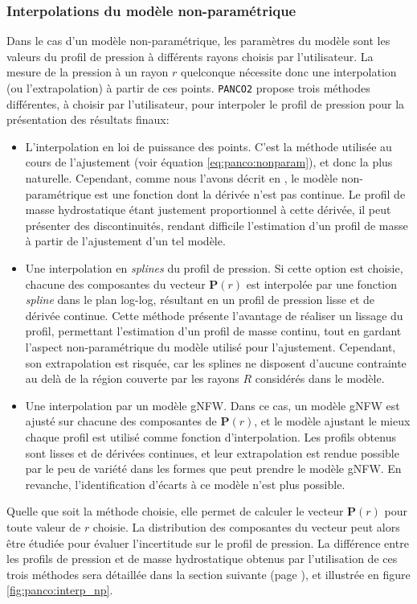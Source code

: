 \subsubsection{Interpolations du modèle non-paramétrique} %
\label{sec:panco:interp_np}
Dans le cas d'un modèle non-paramétrique, les paramètres du modèle sont les valeurs du profil de pression à différents rayons choisis par l'utilisateur.
La mesure de la pression à un rayon $r$ quelconque nécessite donc une interpolation (ou l'extrapolation) à partir de ces points.
\texttt{PANCO2} propose trois méthodes différentes, à choisir par l'utilisateur, pour interpoler le profil de pression pour la présentation des résultats finaux:
\begin{itemize}[leftmargin=*]
    \setlength\itemsep{0pt}
    \item L'interpolation en loi de puissance des points.
        C'est la méthode utilisée au cours de l'ajustement (voir équation \ref{eq:panco:nonparam}), et donc la plus naturelle.
        Cependant, comme nous l'avons décrit en , le modèle non-paramétrique est une fonction dont la dérivée n'est pas continue.
        Le profil de masse hydrostatique étant justement proportionnel à cette dérivée, il peut présenter des discontinuités, rendant difficile l'estimation d'un profil de masse à partir de l'ajustement d'un tel modèle.
    \item Une interpolation en \textit{splines} du profil de pression.
        Si cette option est choisie, chacune des composantes du vecteur $\mathbf{P}(r)$ est interpolée par une fonction \textit{spline} dans le plan log-log, résultant en un profil de pression lisse et de dérivée continue.
        Cette méthode présente l'avantage de réaliser un lissage du profil, permettant l'estimation d'un profil de masse continu, tout en gardant l'aspect non-paramétrique du modèle utilisé pour l'ajustement.
        Cependant, son extrapolation est risquée, car les splines ne disposent d'aucune contrainte au delà de la région couverte par les rayons $R$ considérés dans le modèle.
    \item Une interpolation par un modèle gNFW.
        Dans ce cas, un modèle gNFW est ajusté sur chacune des composantes de $\mathbf{P}(r)$, et le modèle ajustant le mieux chaque profil est utilisé comme fonction d'interpolation.
        Les profils obtenus sont lisses et de dérivées continues, et leur extrapolation est rendue possible par le peu de variété dans les formes que peut prendre le modèle gNFW.
        En revanche, l'identification d'écarts à ce modèle n'est plus possible.
\end{itemize}
Quelle que soit la méthode choisie, elle permet de calculer le vecteur $\mathbf{P}(r)$ pour toute valeur de $r$ choisie.
La distribution des composantes du vecteur peut alors être étudiée pour évaluer l'incertitude sur le profil de pression.
La différence entre les profils de pression et de masse hydrostatique obtenus par l'utilisation de ces trois méthodes sera détaillée dans la section suivante (page \pageref{sec:panco:interp_np_results}), et illustrée en figure \ref{fig:panco:interp_np}.

